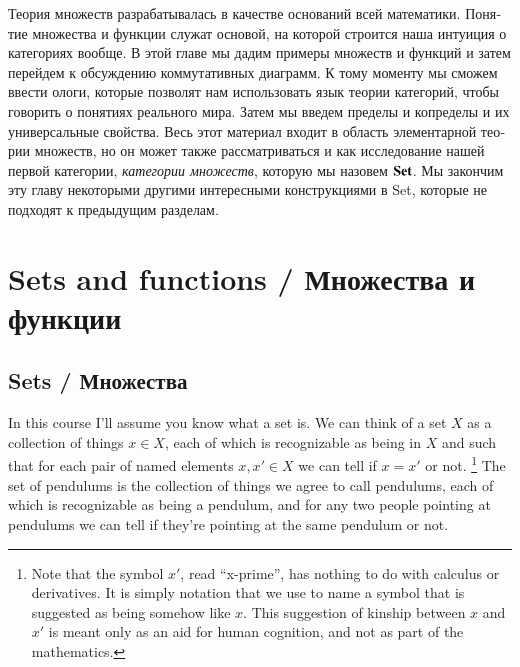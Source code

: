 \documentclass{book}
\def\Set{{\bf Set}}
\theoremstyle{theoremENG}
\theoremstyle{lemmaENG}
\theoremstyle{propositionENG}
\theoremstyle{corollaryENG}
\theoremstyle{factENG}
\theoremstyle{remarkENG}
\theoremstyle{exampleENG}
\theoremstyle{warningENG}
\theoremstyle{questionENG}
\theoremstyle{guessENG}
\theoremstyle{answerENG}
\theoremstyle{constructionENG}
\theoremstyle{rulesENG}
\theoremstyle{excENG}
\theoremstyle{appENG}
\theoremstyle{definitionENG}
\theoremstyle{notationENG}
\theoremstyle{conjectureENG}
\theoremstyle{postulateENG}
\theoremstyle{theoremRUS}
\theoremstyle{lemmaRUS}
\theoremstyle{propositionRUS}
\theoremstyle{corollaryRUS}
\theoremstyle{factRUS}
\theoremstyle{remarkRUS}
\theoremstyle{exampleRUS}
\theoremstyle{warningRUS}
\theoremstyle{questionRUS}
\theoremstyle{guessRUS}
\theoremstyle{answerRUS}
\theoremstyle{constructionRUS}
\theoremstyle{rulesRUS}
\theoremstyle{excRUS}
\theoremstyle{appRUS}
\theoremstyle{definitionRUS}
\theoremstyle{notationRUS}
\theoremstyle{conjectureRUS}
\theoremstyle{postulateRUS}
\begin{document}
\begin{english}
\begin{russian}Теория множеств разрабатывалась в качестве оснований всей математики. Понятие множества и функции служат основой, на которой строится наша интуиция о категориях вообще. В этой главе мы дадим примеры множеств и функций и затем перейдем к обсуждению коммутативных диаграмм. К тому моменту мы сможем ввести ологи, которые позволят нам использовать язык теории категорий, чтобы говорить о понятиях реального мира. Затем мы введем пределы и копределы и их универсальные свойства. Весь этот материал входит в область элементарной теории множеств, но он может также рассматриваться и как исследование нашей первой категории, {\em категории множеств}, которую мы назовем $\Set$. Мы закончим эту главу некоторыми другими интересными конструкциями в Set, которые не подходят к предыдущим разделам.\end{russian}


\section{Sets and functions / Множества и функции} 


\subsection{Sets / Множества}

In this course I'll assume you know what a set is. We can think of a set $X$ as a collection of things $x\in X$, each of which is recognizable as being in $X$ and such that for each pair of named elements $x,x'\in X$ we can tell if $x=x'$ or not.
\footnote{Note that the symbol $x'$, read “x-prime”, has nothing to do with calculus or derivatives. It is simply notation that we use to name a symbol that is suggested as being somehow like $x$. This suggestion of kinship between $x$ and $x'$ is meant only as an aid for human cognition, and not as part of the mathematics.}
The set of pendulums is the collection of things we agree to call pendulums, each of which is recognizable as being a pendulum, and for any two people pointing at pendulums we can tell if they're pointing at the same pendulum or not. 


\end{english}
\end{document}
